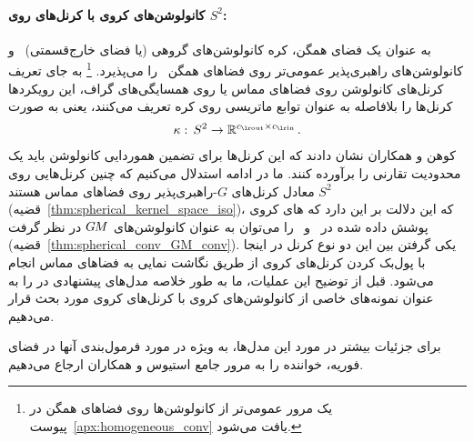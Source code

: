 \paragraph{کانولوشن‌های کروی با کرنل‌های روی $S^2$:}

به عنوان یک فضای همگن، کره کانولوشن‌های گروهی (یا فضای خارج‌قسمتی)~\cite{Kondor2018-GENERAL} و کانولوشن‌های راهبری‌پذیر عمومی‌تر روی فضاهای همگن~\cite{Cohen2019-generaltheory} را می‌پذیرد.%
\footnote{
	یک مرور عمومی‌تر از کانولوشن‌ها روی فضاهای همگن در پیوست~\ref{apx:homogeneous_conv} یافت می‌شود.
}
به جای تعریف کرنل‌های کانولوشن روی فضاهای مماس یا روی همسایگی‌های گراف، این رویکردها کرنل‌ها را بلافاصله به عنوان توابع ماتریسی روی کره تعریف می‌کنند، یعنی به صورت
\begin{align}\label{eq:spherical_kernel}
	\kappa:\, S^2 \to \R^{\cout\times\cin} \,.
\end{align}
\cite{Cohen2019-generaltheory} کوهن و همکاران نشان دادند که این کرنل‌ها برای تضمین هموردایی کانولوشن باید یک محدودیت تقارنی را برآورده کنند.
ما در ادامه استدلال می‌کنیم که چنین کرنل‌هایی روی $S^2$ معادل کرنل‌های $G$-راهبری‌پذیر روی فضاهای مماس هستند (قضیه~\ref{thm:spherical_kernel_space_iso})، که این دلالت بر این دارد که های کروی پوشش داده شده در~\cite{Cohen2019-generaltheory} و~\cite{Kondor2018-GENERAL} را می‌توان به عنوان کانولوشن‌های $G\mkern-1.4muM$ در نظر گرفت (قضیه~\ref{thm:spherical_conv_GM_conv}).
یکی گرفتن بین این دو نوع کرنل در اینجا با پول‌بک کردن کرنل‌های کروی از طریق نگاشت نمایی به فضاهای مماس انجام می‌شود.
قبل از توضیح این عملیات، ما به طور خلاصه مدل‌های پیشنهادی در \cite{Cohen2018-S2CNN,esteves2018zonalSpherical,esteves2020spinweighted,kondor2018ClebschGordan} را به عنوان نمونه‌های خاصی از کانولوشن‌های کروی با کرنل‌های کروی مورد بحث قرار می‌دهیم.

برای جزئیات بیشتر در مورد این مدل‌ها، به ویژه در مورد فرمول‌بندی آنها در فضای فوریه، خواننده را به مرور جامع \cite{esteves2020theoretical} استیوس و همکاران ارجاع می‌دهیم.



